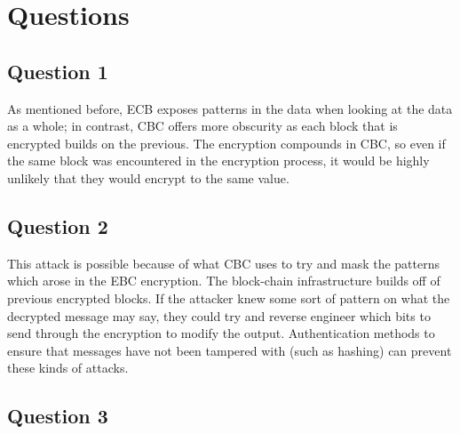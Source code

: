 \documentclass[11pt]{article}
\begin{document}
\section*{Questions}
\subsection*{Question 1}

As mentioned before, ECB exposes patterns in the data when looking at the data as a whole; in contrast, CBC offers more obscurity as each block that is encrypted builds on the previous. The encryption compounds in CBC, so even if the same block was encountered in the encryption process, it would be highly unlikely that they would encrypt to the same value. 

\subsection*{Question 2}

This attack is possible because of what CBC uses to try and mask the patterns which arose in the EBC encryption. The block-chain infrastructure builds off of previous encrypted blocks. If the attacker knew some sort of pattern on what the decrypted message may say, they could try and reverse engineer which bits to send through the encryption to modify the output. Authentication methods to ensure that messages have not been tampered with (such as hashing) can prevent these kinds of attacks.

\subsection*{Question 3}

\end{document}
